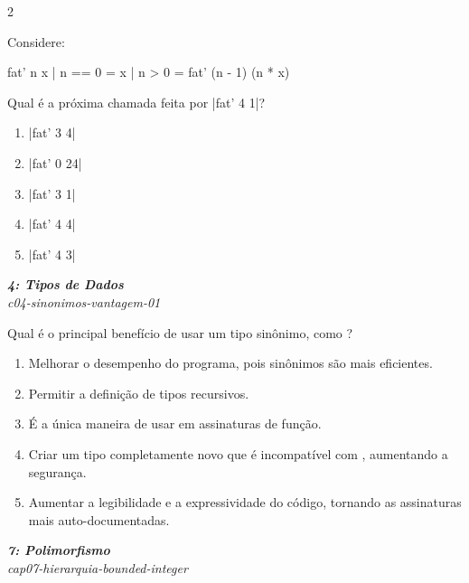 \documentclass[a4paper,10pt,brazil]{article}
\begin{document}
\begin{multicols}{2}
\begin{flushright}
\end{flushright}
Considere:
\begin{haskellcode}
fat' n x
  | n == 0 = x
  | n > 0  = fat' (n - 1) (n * x)
\end{haskellcode}
Qual é a próxima chamada feita por \haskellinline|fat' 4 1|?

\begin{enumerate}
  \item \haskellinline|fat' 3 4|

  \item \haskellinline|fat' 0 24|

  \item \haskellinline|fat' 3 1|

  \item \haskellinline|fat' 4 4|

  \item \haskellinline|fat' 4 3|


\end{enumerate}

\begin{flushright}
  \footnotesize
  \textit{\textbf{4: Tipos de Dados}}\\
  \textit{c04-sinonimos-vantagem-01}\\

\end{flushright}
Qual é o principal benefício de usar um tipo sinônimo, como ?

\begin{enumerate}
  \item Melhorar o desempenho do programa, pois sinônimos são mais eficientes.

  \item Permitir a definição de tipos recursivos.

  \item É a única maneira de usar  em assinaturas de função.

  \item Criar um tipo completamente novo que é incompatível com , aumentando a segurança.

  \item Aumentar a legibilidade e a expressividade do código, tornando as assinaturas mais auto-documentadas.


\end{enumerate}

\begin{flushright}
  \footnotesize
  \textit{\textbf{7: Polimorfismo}}\\
  \textit{cap07-hierarquia-bounded-integer}\\


\end{flushright}
\end{multicols}
\end{document}
